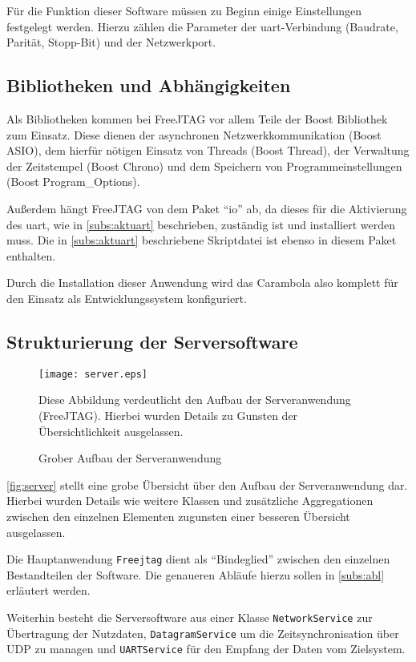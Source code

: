 Für die Funktion dieser Software müssen zu Beginn einige Einstellungen
festgelegt werden. Hierzu zählen die Parameter der \gls{uart}-Verbindung
(Baudrate, Parität, Stopp-Bit) und der Netzwerkport.

\subsection{Bibliotheken und Abhängigkeiten}
Als Bibliotheken kommen bei FreeJTAG vor allem Teile der Boost Bibliothek zum
Einsatz. Diese dienen der asynchronen Netzwerkkommunikation (Boost ASIO), dem
hierfür nötigen Einsatz von Threads (Boost Thread), der Verwaltung der
Zeitstempel (Boost Chrono) und dem Speichern von Programmeinstellungen (Boost
Program\_Options).

Außerdem hängt FreeJTAG von dem Paket "`io"' ab, da dieses für die Aktivierung
des \gls{uart}, wie in \autoref{subs:aktuart} beschrieben, zuständig ist und
installiert werden muss. Die in \autoref{subs:aktuart} beschriebene Skriptdatei
ist ebenso in diesem Paket enthalten. 

Durch die Installation dieser Anwendung wird das Carambola also komplett für den
Einsatz als Entwicklungssystem konfiguriert.

\subsection{Strukturierung der Serversoftware}
\begin{figure}[h]
\centering
\texttt{[image: server.eps]}
\caption{Grober Aufbau der Serveranwendung}{Diese Abbildung verdeutlicht den
Aufbau der Serveranwendung (FreeJTAG). Hierbei wurden Details zu Gunsten der
Übersichtlichkeit ausgelassen.}
\label{fig:server}
\end{figure}
\autoref{fig:server} stellt eine grobe Übersicht über den Aufbau der
Serveranwendung dar. Hierbei wurden Details wie weitere Klassen und
zusätzliche Aggregationen zwischen den einzelnen Elementen zugunsten einer
besseren Übersicht ausgelassen.

Die Hauptanwendung \texttt{Freejtag} dient als "`Bindeglied"' zwischen den
einzelnen Bestandteilen der Software. Die genaueren Abläufe hierzu sollen in
\autoref{subs:abl} erläutert werden.

Weiterhin besteht die Serversoftware aus einer Klasse
\texttt{NetworkService} zur Übertragung der Nutzdaten, \texttt{DatagramService}
um die Zeitsynchronisation über UDP zu managen und \texttt{UARTService} für den
Empfang der Daten vom Zielsystem.

